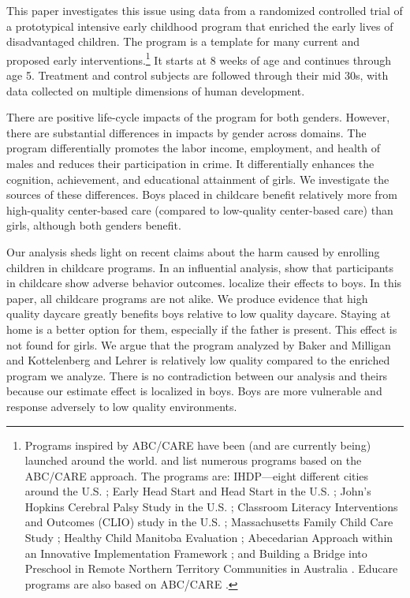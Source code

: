 This paper investigates this issue using data from a randomized controlled trial of a prototypical intensive early childhood program that enriched the early lives of disadvantaged children. The program is a template for many current and proposed early interventions.\footnote{Programs inspired by ABC/CARE have been (and are currently being) launched around the world. \citet{Sparling_2010_Highlights} and \citet{Ramey_Ramey_Lanzi_2014_Interventions} list numerous programs based on the ABC/CARE approach. The programs are: IHDP---eight different cities around the U.S. \citep{Spiker-etal_1997_Helping}; Early Head Start and Head Start in the U.S. \citep{Schneider_McDonald-eds_2007_Scale-Up_Vol-1}; John's Hopkins Cerebral Palsy Study in the U.S. \citep{Sparling_2010_Highlights}; Classroom Literacy Interventions and Outcomes (CLIO) study in the U.S. \citep{Sparling_2010_Highlights}; Massachusetts Family Child Care Study \citep{Collins_etal_2010_Massachusetts-Study}; Healthy Child Manitoba Evaluation \citep{Healthy_Child_Manitoba_2015_Starting-Early}; Abecedarian Approach within an Innovative Implementation Framework \citep{Jensen_Nielsen_2016_ABC-Programme-Pilot}; and Building a Bridge into Preschool in Remote Northern Territory Communities in Australia \citep{UMonash_Dataset_2015_URL}. Educare programs are also based on ABC/CARE \citep{Educare_2014_Research_Agenda,Yazejian_Bryant_2012_Educare}.} It starts at 8 weeks of age and continues through age 5. Treatment and control subjects are followed through their mid 30s, with data collected on multiple dimensions of human development.

There are positive life-cycle impacts of the program for both genders. However, there are substantial differences in impacts by gender across domains. The program differentially promotes the labor income, employment, and health of males and reduces their participation in crime. It differentially enhances the cognition, achievement, and educational attainment of girls. We investigate the sources of these differences. Boys placed in childcare benefit relatively more from high-quality center-based care (compared to low-quality center-based care) than girls, although both genders benefit.

Our analysis sheds light on recent claims about the harm caused by enrolling children in childcare programs. In an influential analysis, \citet{Baker_Gruber_etal_2008_JPE} show that participants in childcare show adverse behavior outcomes. \citet{Kottelenberg-Lehrer_2014_Gender-Effects} localize their effects to boys. In this paper, all childcare programs are not alike. We produce evidence that high quality daycare greatly benefits boys relative to low quality daycare. Staying at home is a better option for them, especially if the father is present. This effect is not found for girls. We argue that the program analyzed by Baker and Milligan and Kottelenberg and Lehrer is relatively low quality compared to the enriched program we analyze. There is no contradiction between our analysis and theirs because our estimate effect is localized in boys. Boys are more vulnerable and response adversely to low quality environments.

